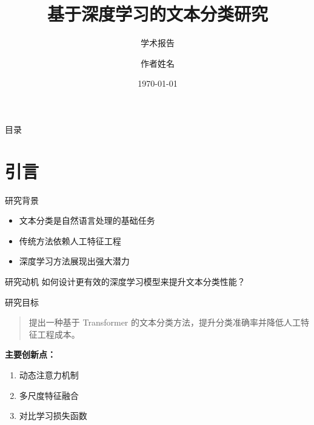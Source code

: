 \documentclass[aspectratio=169]{beamer}
\title[短标题]{基于深度学习的文本分类研究}
\subtitle{学术报告}
\author[作者]{作者姓名}
\institute[机构]{某某大学 \\ 计算机科学与技术学院}
\date{\today}
\begin{document}
\begin{frame}
  \titlepage
\end{frame}

\begin{frame}{目录}
  \tableofcontents
\end{frame}

\section{引言}

\begin{frame}{研究背景}
  \begin{itemize}
    \item 文本分类是自然语言处理的基础任务
    \item 传统方法依赖人工特征工程
    \item 深度学习方法展现出强大潜力
  \end{itemize}

  \vspace{1em}
  \begin{block}{研究动机}
    如何设计更有效的深度学习模型来提升文本分类性能？
  \end{block}
\end{frame}

\begin{frame}{研究目标}
  \begin{quote}
    提出一种基于 Transformer 的文本分类方法，提升分类准确率并降低人工特征工程成本。
  \end{quote}

  \vspace{1em}
  \textbf{主要创新点：}
  \begin{enumerate}
    \item 动态注意力机制
    \item 多尺度特征融合
    \item 对比学习损失函数
  \end{enumerate}
\end{frame}
\end{document}
